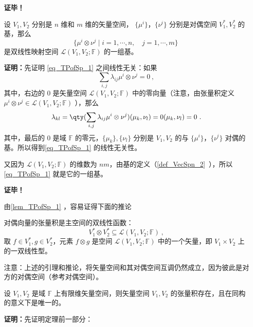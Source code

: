 \textbf{证毕！}

\begin{lemma}{}\label{lem_TPofSp_1}
设 $V_1,V_2$ 分别是 $n$ 维和 $m$ 维的矢量空间， $\{\mu^i\}$，$\{\nu^i\}$ 分别是对偶空间 $V_1^*,V_2^*$ 的基，那么
\begin{equation}\label{eq_TPofSp_1}
\{\mu^i\otimes\nu^j \mid i=1,\cdots,n,\quad j=1,\cdots,m \}~
\end{equation}
是双线性映射空间 $\mathcal L(V_1,V_2;\mathbb F)$ 的一组基。
\end{lemma}

\textbf{证明：}先证明 \autoref{eq_TPofSp_1} 之间线性无关：如果
\begin{equation}
\sum_{i,j}\lambda_{ij}\mu^i\otimes\nu^j=0~,
\end{equation}
其中，右边的 $0$ 是矢量空间 $\mathcal L(V_1,V_2;\mathbb F)$
中的零向量（注意，由张量积定义 $\mu^i\otimes\nu^j\in \mathcal L(V_1,V_2;\mathbb F)$ ），那么
\begin{equation}
\lambda_{kl}=\qty(\sum_{i,j}\lambda_{ij}\mu^i\otimes\nu^j)(\mu_k,\nu_l)=0(\mu_k,\nu_l)=0~.
\end{equation}
其中，最后的 $0$ 是域 $\mathbb F$ 的零元，$\{\mu_k\},\{\nu_l\}$ 分别是 $V_1,V_2$ 的与 $\{\mu^i\}$，$\{\nu^i\}$ 对偶的基。所以得到\autoref{eq_TPofSp_1} 的线性无关性。

又因为 $\mathcal L(V_1,V_2;\mathbb F)$ 的维数为 $nm$，由基的定义（\autoref{def_VecSpn_2}~），所以\autoref{eq_TPofSp_1} 就是它的一组基。

\textbf{证毕！}

由\autoref{lem_TPofSp_1} ，容易证得下面的推论
\begin{corollary}{}\label{cor_TPofSp_1}
对偶向量的张量积是主空间的双线性函数：
\begin{equation}
V_1^* \otimes V_2^* \subseteq \mathcal L(V_1,V_2;\mathbb F)~,
\end{equation}
取 $f \in V_1^*,g \in V_2^*$，元素 $f \otimes g$ 是空间 $\mathcal L(V_1,V_2;\mathbb F)$ 中的一个矢量，即 $V_1 \times V_2$ 上的一双线性型。
\end{corollary}

注意：上述的引理和推论，将矢量空间和其对偶空间互调仍然成立，因为彼此是对方的对偶空间（参考对偶空间）。

\begin{theorem}{}\label{the_TPofSp_1}
设 $V_1,V_2$ 是域 $\mathbb F$ 上有限维矢量空间，则矢量空间 $V_1,V_2$ 的张量积存在，且在同构的意义下是唯一的。
\end{theorem}
\textbf{证明：}先证明定理前一部分：

